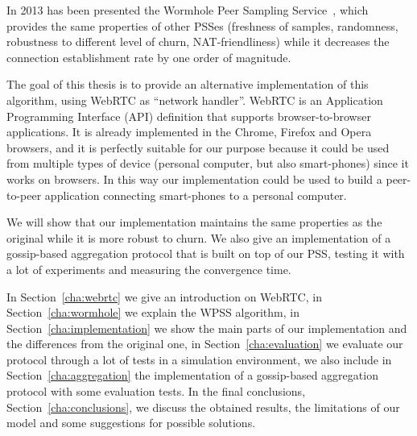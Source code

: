 In 2013 has been presented the Wormhole Peer Sampling Service~\cite{wormhole}, which provides the same properties of other PSSes (freshness of samples, randomness, robustness to different level of churn, NAT-friendliness) while it decreases the connection establishment rate by one order of magnitude. 

The goal of this thesis is to provide an alternative implementation of this algorithm, using WebRTC as ``network handler''. WebRTC is an Application Programming Interface (API) definition that supports browser-to-browser applications. It is already implemented in the Chrome, Firefox and Opera browsers, and it is perfectly suitable for our purpose because it could be used from multiple types of device (personal computer, but also smart-phones) since it works on browsers. In this way our implementation could be used to build a peer-to-peer application connecting smart-phones to a personal computer.

We will show that our implementation maintains the same properties as the original while it is more robust to churn. We also give an implementation of a gossip-based aggregation protocol that is built on top of our PSS, testing it with a lot of experiments and measuring the convergence time.

In Section~\ref{cha:webrtc} we give an introduction on WebRTC, in Section~\ref{cha:wormhole} we explain the WPSS algorithm, in Section~\ref{cha:implementation} we show the main parts of our implementation and the differences from the original one, in Section~\ref{cha:evaluation} we evaluate our protocol through a lot of tests in a simulation environment, we also include in Section~\ref{cha:aggregation} the implementation of a gossip-based aggregation protocol with some evaluation tests. In the final conclusions, Section~\ref{cha:conclusions}, we discuss the obtained results, the limitations of our model and some suggestions for possible solutions.
